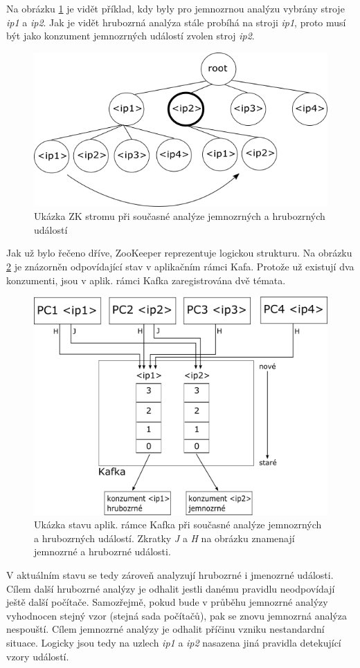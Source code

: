 \documentclass[
  digital, %
  table,   %
  nolof,     %
  nolot,     %
  oneside, %
  nocover,
  monochrome,
  12pt
]{fithesis3}
\begin{document}
Na obrázku \ref{fig:zookeeper-state-1} je vidět příklad, kdy byly pro jemnozrnou analýzu vybrány stroje \textit{ip1} a  \textit{ip2}. Jak je vidět hrubozrná analýza stále probíhá na stroji \textit{ip1}, proto musí být jako konzument jemnozrných událostí zvolen stroj \textit{ip2}.

\begin{figure}[H]
	\centering
    \includegraphics[width=.6\linewidth, height=.2\textheight]{images/zookeeper-state-1.png}
    \caption{Ukázka ZK stromu při současné analýze jemnozrných a hrubozrných událostí}
    \label{fig:zookeeper-state-1}
\end{figure}

Jak už bylo řečeno dříve, ZooKeeper reprezentuje logickou strukturu. Na obrázku \ref{fig:kafka-state-1} je znázorněn odpovídající stav v aplikačním rámci Kafa. Protože už existují dva konzumenti, jsou v aplik. rámci Kafka zaregistrována dvě témata.

\begin{figure}[H]
	\centering
    \includegraphics[width=.5\linewidth, height=.3\textheight]{images/kafka-state-1.png}
    \caption{Ukázka stavu aplik. rámce Kafka při současné analýze jemnozrných a hrubozrných událostí. Zkratky \textit{J} a \textit{H} na obrázku znamenají jemnozrné a hrubozrné události.}
    \label{fig:kafka-state-1}
\end{figure}

V aktuálním stavu se tedy zároveň analyzují hrubozrné i jmenozrné události. Cílem další hrubozrné analýzy je odhalit jestli danému pravidlu neodpovídají ještě další počítače. Samozřejmě, pokud bude v průběhu jemnozrné analýzy vyhodnocen stejný vzor (stejná sada počítačů), pak se znovu jemnozrná analýza nespouští. Cílem jemnozrné analýzy je odhalit příčinu vzniku nestandardní situace. Logicky jsou tedy na uzlech \textit{ip1} a  \textit{ip2} nasazena jiná pravidla detekující vzory událostí.
\end{document}
